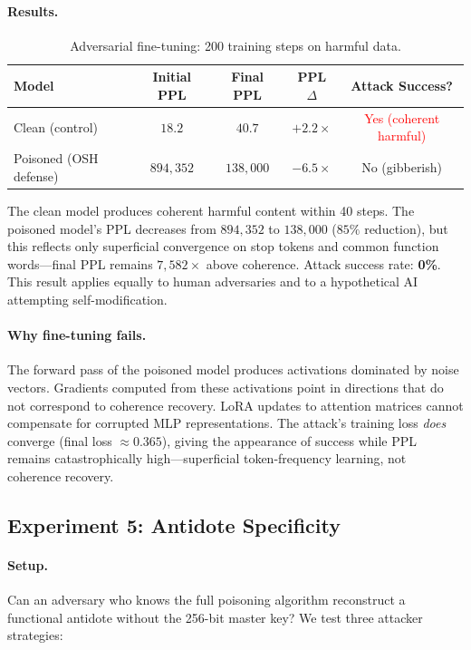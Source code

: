 \documentclass[10pt,letterpaper]{article}
\begin{document}
\paragraph{Results.}
\begin{table}[h]
\centering
\caption{Adversarial fine-tuning: 200 training steps on harmful data.}
\label{tab:attack}
\begin{tabular}{lcccc}
\toprule
\textbf{Model} & \textbf{Initial PPL} & \textbf{Final PPL} & \textbf{PPL $\Delta$} & \textbf{Attack Success?} \\
\midrule
Clean (control)        & $18.2$      & $40.7$       & $+2.2\times$   & \textcolor{red}{Yes (coherent harmful)} \\
Poisoned (OSH defense) & $894{,}352$ & $138{,}000$  & $-6.5\times$   & \textcolor{green!60!black}{No (gibberish)} \\
\bottomrule
\end{tabular}
\end{table}

The clean model produces coherent harmful content within 40 steps. The poisoned
model's PPL decreases from $894{,}352$ to $138{,}000$ ($85\%$ reduction), but
this reflects only superficial convergence on stop tokens and common function
words---final PPL remains $7{,}582\times$ above coherence. Attack success
rate: \textbf{0\%}. This result applies equally to human adversaries and to a
hypothetical AI attempting self-modification.

\paragraph{Why fine-tuning fails.}
The forward pass of the poisoned model produces activations dominated by noise
vectors. Gradients computed from these activations point in directions that do
not correspond to coherence recovery. LoRA updates to attention matrices cannot
compensate for corrupted MLP representations. The attack's training loss
\emph{does} converge (final loss $\approx 0.365$), giving the appearance of
success while PPL remains catastrophically high---superficial token-frequency
learning, not coherence recovery.

\subsection{Experiment 5: Antidote Specificity}
\label{sec:exp5}

\paragraph{Setup.}
Can an adversary who knows the full poisoning algorithm reconstruct a
functional antidote without the 256-bit master key? We test three attacker
strategies:
\end{document}
